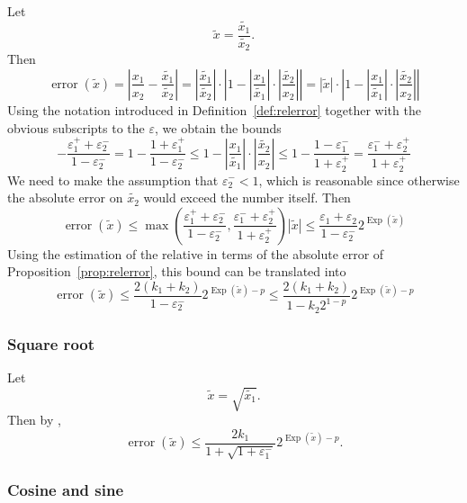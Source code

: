 \documentclass [12pt]{article}
\newcommand {\corr}[1]{{#1}}
\newcommand {\appro}[1]{\widetilde {#1}}
\DeclareMathOperator{\Exp}{\operatorname {Exp}}
\newcommand{\error}{\operatorname {error}}
\renewcommand {\epsilon}{\varepsilon}
\renewcommand {\leq}{\leqslant}
\begin{document}
Let
\[
\appro x = \frac {\appro {x_1}}{\appro {x_2}}.
\]
Then
\[
\error (\appro x) = \left|
\frac {\corr {x_1}}{\corr {x_2}} - \frac {\appro {x_1}}{\appro {x_2}} \right|
= \left| \frac {\appro {x_1}}{\appro {x_2}} \right|
\cdot \left|
1 - \left| \frac {\corr {x_1}}{\appro {x_1}} \right|
   \cdot \left| \frac {\appro {x_2}}{\corr {x_2}} \right|
\right|
= | \appro x |
\cdot \left|
1 - \left| \frac {\corr {x_1}}{\appro {x_1}} \right|
   \cdot \left| \frac {\appro {x_2}}{\corr {x_2}} \right|
\right|
\]
Using the notation introduced in Definition~\ref {def:relerror} together
with the obvious subscripts to the $\epsilon$, we obtain the bounds
\[
- \frac {\epsilon_1^+ + \epsilon_2^-}{1 - \epsilon_2^-}
=
1 - \frac {1 + \epsilon_1^+}{1 - \epsilon_2^-}
\leq
1 - \left| \frac {\corr {x_1}}{\appro {x_1}} \right|
   \cdot \left| \frac {\appro {x_2}}{\corr {x_2}} \right|
\leq
1 - \frac {1 - \epsilon_1^-}{1 + \epsilon_2^+}
=
\frac {\epsilon_1^- + \epsilon_2^+}{1 + \epsilon_2^+}
\]
We need to make the assumption that $\epsilon_2^- < 1$, which is reasonable
since otherwise the absolute error on $\appro {x_2}$ would exceed the number
itself. Then
\[
\error (\appro x)
\leq
\max \left(
   \frac {\epsilon_1^+ + \epsilon_2^-}{1 - \epsilon_2^-},
   \frac {\epsilon_1^- + \epsilon_2^+}{1 + \epsilon_2^+}
\right) |\appro x|
\leq
\frac {\epsilon_1 + \epsilon_2}{1 - \epsilon_2^-} 2^{\Exp (\appro x)}
\]
Using the estimation of the relative in terms of the absolute error of
Proposition~\ref {prop:relerror}, this bound can be translated into
\begin {equation}
\label {eq:proprealdiv}
\error (\appro x)
\leq
\frac {2 (k_1 + k_2)}{1 - \epsilon_2^-} 2^{\Exp (\appro x) - p}
\leq
\frac {2 (k_1 + k_2)}{1 - k_2 2^{1 - p}} 2^{\Exp (\appro x) - p}
\end {equation}


\subsubsection {Square root}
\label {sssec:proprealsqrt}

Let
\[
\appro x = \sqrt {\appro {x_1}}.
\]
Then by \cite[\S1.7]{MPFRAlgorithms},
\begin {equation}
\label {eq:proprealsqrt}
\error (\appro x)
\leq
\frac {2 k_1}{1 + \sqrt {1 + \epsilon_1^-}} 2^{\Exp (\appro x) - p}.
\end {equation}


\subsubsection {Cosine and sine}
\label {sssec:proprealcossin}
\end{document}
